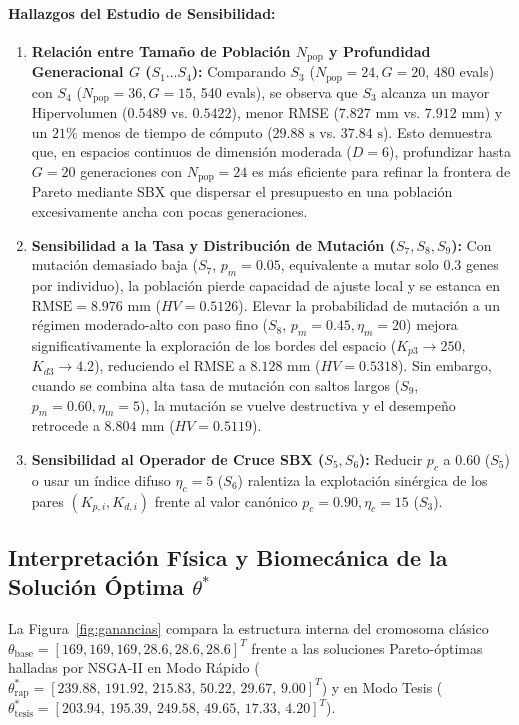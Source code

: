 \documentclass[11pt,a4paper]{article}
\begin{document}
\paragraph{Hallazgos del Estudio de Sensibilidad:}
\begin{enumerate}
    \item \textbf{Relación entre Tamaño de Población $N_{\text{pop}}$ y Profundidad Generacional $G$ ($S_1 \dots S_4$):} Comparando $S_3$ ($N_{\text{pop}}=24, G=20$, 480 evals) con $S_4$ ($N_{\text{pop}}=36, G=15$, 540 evals), se observa que $S_3$ alcanza un mayor Hipervolumen ($0.5489$ vs. $0.5422$), menor RMSE ($7.827\text{ mm}$ vs. $7.912\text{ mm}$) y un $21\%$ menos de tiempo de cómputo ($29.88\text{ s}$ vs. $37.84\text{ s}$). Esto demuestra que, en espacios continuos de dimensión moderada ($D=6$), profundizar hasta $G=20$ generaciones con $N_{\text{pop}}=24$ es más eficiente para refinar la frontera de Pareto mediante SBX que dispersar el presupuesto en una población excesivamente ancha con pocas generaciones.
    \item \textbf{Sensibilidad a la Tasa y Distribución de Mutación ($S_7, S_8, S_9$):} Con mutación demasiado baja ($S_7$, $p_m = 0.05$, equivalente a mutar solo 0.3 genes por individuo), la población pierde capacidad de ajuste local y se estanca en $\text{RMSE} = 8.976\text{ mm}$ ($HV = 0.5126$). Elevar la probabilidad de mutación a un régimen moderado-alto con paso fino ($S_8$, $p_m = 0.45, \eta_m = 20$) mejora significativamente la exploración de los bordes del espacio ($K_{p3} \to 250$, $K_{d3} \to 4.2$), reduciendo el RMSE a $8.128\text{ mm}$ ($HV = 0.5318$). Sin embargo, cuando se combina alta tasa de mutación con saltos largos ($S_9$, $p_m = 0.60, \eta_m = 5$), la mutación se vuelve destructiva y el desempeño retrocede a $8.804\text{ mm}$ ($HV = 0.5119$).
    \item \textbf{Sensibilidad al Operador de Cruce SBX ($S_5, S_6$):} Reducir $p_c$ a $0.60$ ($S_5$) o usar un índice difuso $\eta_c = 5$ ($S_6$) ralentiza la explotación sinérgica de los pares $(K_{p,i}, K_{d,i})$ frente al valor canónico $p_c = 0.90, \eta_c = 15$ ($S_3$).
\end{enumerate}

\subsection{Interpretación Física y Biomecánica de la Solución Óptima $\theta^*$}
La Figura~\ref{fig:ganancias} compara la estructura interna del cromosoma clásico $\theta_{\text{base}} = [169, 169, 169, 28.6, 28.6, 28.6]^T$ frente a las soluciones Pareto-óptimas halladas por NSGA-II en Modo Rápido ($\theta^*_{\text{rap}} = [239.88,\, 191.92,\, 215.83,\, 50.22,\, 29.67,\, 9.00]^T$) y en Modo Tesis ($\theta^*_{\text{tesis}} = [203.94,\, 195.39,\, 249.58,\, 49.65,\, 17.33,\, 4.20]^T$).
\end{document}
